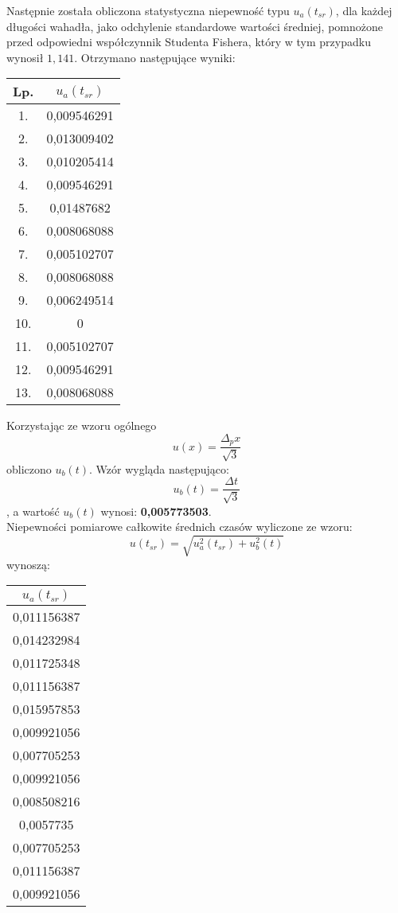 \documentclass{article}
\begin{document}
\begin{small}
\begin{center}
\begin{tabular}{|c|c|}
\end{tabular}
\end{center}
Następnie została obliczona statystyczna niepewność typu $u_a(t_{sr})$, dla każdej długości wahadła,  jako odchylenie standardowe wartości średniej, pomnożone przed odpowiedni współczynnik Studenta 
Fishera, który w tym przypadku wynosił $1,141$. Otrzymano następujące wyniki:
\begin{center}
\begin{tabular}{|c|c|} \hline
Lp. & $u_a(t_{sr})$ \\ \hline
1. & 0,009546291 \\ \hline
2. & 0,013009402 \\ \hline
3. & 0,010205414\\ \hline
4. & 0,009546291\\ \hline
5. & 0,01487682\\ \hline
6. & 0,008068088\\ \hline
7. & 0,005102707\\ \hline
8. & 0,008068088\\ \hline
9. & 0,006249514\\ \hline
10. & 0\\ \hline
11. & 0,005102707\\ \hline
12. & 0,009546291\\ \hline
13. & 0,008068088\\ \hline
\end{tabular}

\end{center}
Korzystając ze wzoru ogólnego $$u(x) = \frac{\Delta_{p}x}{\sqrt{3}}$$ obliczono $u_b(t)$. Wzór wygląda następująco: $$ u_b(t)=\frac{\Delta t}{\sqrt{3}}$$, a wartość $u_b(t)$ wynosi: \textbf{ 0,005773503}. \\
Niepewności pomiarowe całkowite średnich czasów wyliczone ze wzoru: $$u(t_{sr})=\sqrt{u_a^2(t_{sr})+u_b^2(t)} $$ wynoszą:
\begin{center}

\begin{tabular}{|c|} \hline
 $u_a(t_{sr})$ \\ \hline
0,011156387 \\ \hline
0,014232984 \\ \hline
0,011725348 \\ \hline
0,011156387 \\ \hline
0,015957853 \\ \hline
0,009921056 \\ \hline
0,007705253 \\ \hline
0,009921056 \\ \hline
0,008508216 \\ \hline
0,0057735  \\ \hline
0,007705253 \\ \hline
0,011156387 \\ \hline
0,009921056\\ \hline
\end{tabular}


\end{center}
\end{small}
\end{document}
